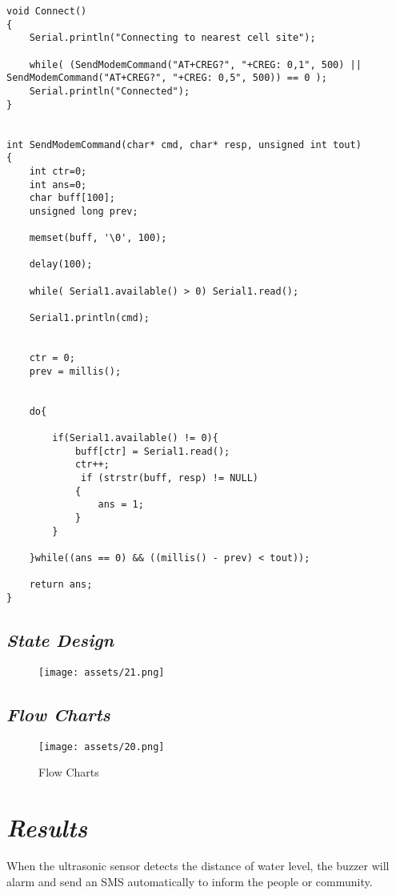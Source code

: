 \documentclass[11pt]{article}
\begin{document}
{\begin{lstlisting}
void Connect()
{
    Serial.println("Connecting to nearest cell site");

    while( (SendModemCommand("AT+CREG?", "+CREG: 0,1", 500) || SendModemCommand("AT+CREG?", "+CREG: 0,5", 500)) == 0 ); 
    Serial.println("Connected");
}


int SendModemCommand(char* cmd, char* resp, unsigned int tout)
{
    int ctr=0;
    int ans=0;
    char buff[100];
    unsigned long prev;

    memset(buff, '\0', 100);
    
    delay(100);
    
    while( Serial1.available() > 0) Serial1.read(); 
    
    Serial1.println(cmd);    


    ctr = 0;
    prev = millis();


    do{

        if(Serial1.available() != 0){    
            buff[ctr] = Serial1.read();
            ctr++;
             if (strstr(buff, resp) != NULL)    
            {
                ans = 1;
            }
        }

    }while((ans == 0) && ((millis() - prev) < tout));    

    return ans;
}
\end{lstlisting}

\subsection{\emph{State Design}}

\begin{figure}[H] 
\centering
\texttt{[image: assets/21.png]}
\caption{}
  
\end{figure} 

\subsection{\emph{Flow Charts}}

\begin{figure}[h!]
\centering
\texttt{[image: assets/20.png]}
\caption{Flow Charts}

\end{figure}

\section{\emph{Results}} 
When the ultrasonic sensor detects the distance of water level, the buzzer will alarm and send an SMS automatically to inform the people or community.

}
\end{document}
